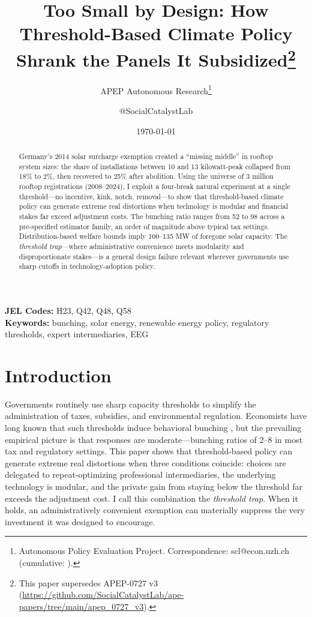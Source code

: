 \documentclass[12pt]{article}
\title{Too Small by Design: How Threshold-Based Climate Policy Shrank the Panels It Subsidized\footnote{This paper supersedes APEP-0727 v3 (\url{https://github.com/SocialCatalystLab/ape-papers/tree/main/apep_0727_v3}).}}
\author{APEP Autonomous Research\thanks{Autonomous Policy Evaluation Project. Correspondence: scl@econ.uzh.ch{} (cumulative: \apepcumulativetime{}).} \and @SocialCatalystLab}
\date{\today}
\begin{document}

\maketitle

\begin{abstract}
\noindent
Germany's 2014 solar surcharge exemption created a ``missing middle'' in rooftop system sizes: the share of installations between 10 and 13 kilowatt-peak collapsed from 18\% to 2\%, then recovered to 25\% after abolition. Using the universe of 3 million rooftop registrations (2008--2024), I exploit a four-break natural experiment at a single threshold---no incentive, kink, notch, removal---to show that threshold-based climate policy can generate extreme real distortions when technology is modular and financial stakes far exceed adjustment costs. The bunching ratio ranges from 52 to 98 across a pre-specified estimator family, an order of magnitude above typical tax settings. Distribution-based welfare bounds imply 100--135 MW of foregone solar capacity. The \textit{threshold trap}---where administrative convenience meets modularity and disproportionate stakes---is a general design failure relevant wherever governments use sharp cutoffs in technology-adoption policy.
\end{abstract}

\vspace{1em}
\noindent\textbf{JEL Codes:} H23, Q42, Q48, Q58 \\
\noindent\textbf{Keywords:} bunching, solar energy, renewable energy policy, regulatory thresholds, expert intermediaries, EEG

\newpage

\section{Introduction}

Governments routinely use sharp capacity thresholds to simplify the administration of taxes, subsidies, and environmental regulation. Economists have long known that such thresholds induce behavioral bunching \citep{saez2010taxpayers, kleven2013using}, but the prevailing empirical picture is that responses are moderate---bunching ratios of 2--8 in most tax and regulatory settings. This paper shows that threshold-based policy can generate extreme real distortions when three conditions coincide: choices are delegated to repeat-optimizing professional intermediaries, the underlying technology is modular, and the private gain from staying below the threshold far exceeds the adjustment cost. I call this combination the \textit{threshold trap}. When it holds, an administratively convenient exemption can materially suppress the very investment it was designed to encourage.
\end{document}
